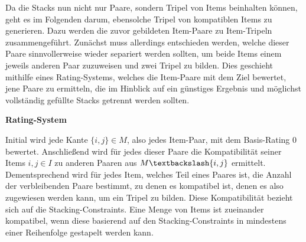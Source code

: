 Da die Stacks nun nicht nur Paare, sondern Tripel von Items beinhalten können, geht es im Folgenden darum,
ebensolche Tripel von kompatiblen Items zu generieren. Dazu werden die zuvor gebildeten Item-Paare zu Item-Tripeln zusammengeführt.
Zunächst muss allerdings entschieden werden, welche dieser Paare sinnvollerweise wieder separiert werden sollten,
um beide Items einem jeweils anderen Paar zuzuweisen und zwei Tripel zu bilden. Dies geschieht mithilfe eines Rating-Systems, welches die Item-Paare mit dem Ziel bewertet, jene Paare zu ermitteln, die im Hinblick auf ein günstiges Ergebnis
und möglichst vollständig gefüllte Stacks getrennt werden sollten.

\vfill
\pagebreak

\textbf{Rating-System}

Initial wird jede Kante $\{i, j\} \in M$, also jedes Item-Paar, mit dem Basis-Rating $0$ bewertet.
Anschließend wird für jedes dieser Paare die Kompatibilität seiner Items $i, j \in I$ zu anderen Paaren aus $M \textbackslash \{i, j\}$ ermittelt.
Dementsprechend wird für jedes Item, welches Teil eines Paares ist, die Anzahl der verbleibenden Paare bestimmt, zu denen es kompatibel ist, denen es also zugewiesen werden kann, um ein Tripel zu bilden. Diese Kompatibilität bezieht sich auf die Stacking-Constraints.
Eine Menge von Items ist zueinander kompatibel, wenn diese basierend auf den Stacking-Constraints in mindestens einer
Reihenfolge gestapelt werden kann.

